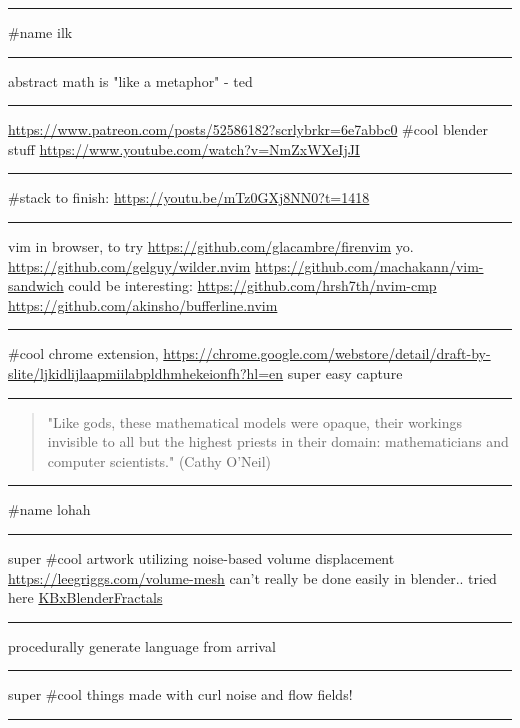\documentclass[letterpaper]{article}
\begin{document}
\noindent\rule{\textwidth}{0.5pt}

\#name ilk

\noindent\rule{\textwidth}{0.5pt}

abstract math is "like a metaphor" - ted

\noindent\rule{\textwidth}{0.5pt}

\url{https://www.patreon.com/posts/52586182?scrlybrkr=6e7abbc0} \#cool blender
stuff \url{https://www.youtube.com/watch?v=NmZxWXeIjJI}

\noindent\rule{\textwidth}{0.5pt}

\#stack to finish: \url{https://youtu.be/mTz0GXj8NN0?t=1418}

\noindent\rule{\textwidth}{0.5pt}

vim in browser, to try \url{https://github.com/glacambre/firenvim} yo.
\url{https://github.com/gelguy/wilder.nvim}
\url{https://github.com/machakann/vim-sandwich} could be interesting:
\url{https://github.com/hrsh7th/nvim-cmp}
\url{https://github.com/akinsho/bufferline.nvim}

\noindent\rule{\textwidth}{0.5pt}

\#cool chrome extension,
\url{https://chrome.google.com/webstore/detail/draft-by-slite/ljkidlijlaapmiilabpldhmhekeionfh?hl=en}
super easy capture

\noindent\rule{\textwidth}{0.5pt}

\begin{quote}
"Like gods, these mathematical models were opaque, their workings
invisible to all but the highest priests in their domain:
mathematicians and computer scientists." (Cathy O'Neil)
\end{quote}

\noindent\rule{\textwidth}{0.5pt}

\#name lohah

\noindent\rule{\textwidth}{0.5pt}

super \#cool artwork utilizing noise-based volume displacement
\url{https://leegriggs.com/volume-mesh} can't really be done easily in
blender.. tried here \href{KBxBlenderFractals.org}{KBxBlenderFractals}

\noindent\rule{\textwidth}{0.5pt}

procedurally generate language from arrival

\noindent\rule{\textwidth}{0.5pt}

super \#cool things made with curl noise and flow fields!

\noindent\rule{\textwidth}{0.5pt}
\end{document}
